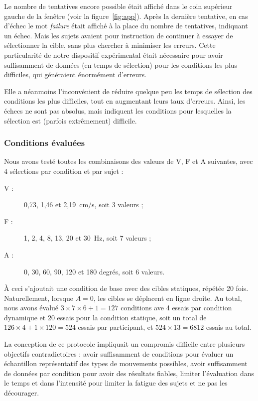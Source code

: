 	Le nombre de tentatives encore possible était affiché dans le coin supérieur gauche de la fenêtre (voir la figure~\ref{fig:app}). Après la dernière tentative, en cas d'échec le mot \emph{failure} était affiché à la place du nombre de tentatives, indiquant un échec. Mais les sujets avaient pour instruction de continuer à essayer de sélectionner la cible, sans plus chercher à minimiser les erreurs. Cette particularité de notre dispositif expérimental était nécessaire pour avoir suffisamment de données (en temps de sélection) pour les conditions les plus difficiles, qui généraient énormément d'erreurs.
	
	Elle a néanmoins l'inconvénient de réduire quelque peu les temps de sélection des conditions les plus difficiles, tout en augmentant leurs taux d'erreurs. Ainsi, les échecs ne sont pas absolus, mais indiquent les conditions pour lesquelles la sélection est (parfois extrêmement) difficile.
	
	\subsubsection{Conditions évaluées}
	Nous avons testé toutes les combinaisons des valeurs de V, F et A suivantes, avec 4 sélections par condition et par sujet :
	
	\begin{description}
		\item[V :] 0,73, 1,46 et 2,19~cm/s, soit 3 valeurs ;
		\item[F :] 1, 2, 4, 8, 13, 20 et 30~Hz, soit 7 valeurs ;
		\item[A :] 0, 30, 60, 90, 120 et 180 degrés, soit 6 valeurs.
	\end{description}
	
	À ceci s'ajoutait une condition de base avec des cibles statiques, répétée 20 fois. Naturellement, lorsque $A = 0$, les cibles se déplacent en ligne droite. Au total, nous avons évalué $3 \times 7 \times 6 + 1 = 127$ conditions ave 4 essais par condition dynamique et 20 essais pour la condition statique, soit un total de $126 \times 4 + 1 \times 120 = 524$ essais par participant, et $524 \times 13 = 6812$ essais au total.
	
	La conception de ce protocole impliquait un compromis difficile entre plusieurs objectifs contradictoires : avoir suffisamment de conditions pour évaluer un échantillon représentatif des types de mouvements possibles, avoir suffisamment de données par condition pour avoir des résultats fiables, limiter l'évaluation dans le temps et dans l'intensité pour limiter la fatigue des sujets et ne pas les décourager.
	
